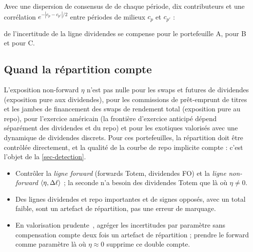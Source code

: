 \begin{example}[Matérialité]\label{ex-materiality}
Avec une dispersion de consensus de  de chaque période, dix contributeurs et une corrélation $e^{-|c_p-c_{p'}|/2}$
entre périodes de milieux $c_p$ et $c_{p'}$ :
\begin{center}\end{center}
\vMatA{} de l'incertitude de la ligne dividendes se compense pour le portefeuille A, \vMatB{} pour B et \vMatC{} pour C.
\end{example}

\subsection{Quand la répartition compte}
L'exposition non-forward $\eta$ n'est pas nulle pour les swaps et futures de dividendes (exposition pure aux
dividendes), pour les commissions de prêt-emprunt de titres et les jambes de financement des swaps de rendement total
(exposition pure au repo), pour l'exercice américain (la frontière d'exercice anticipé dépend séparément des
dividendes et du repo) et pour les exotiques valorisés avec une dynamique de dividendes discrets. Pour ces
portefeuilles, la répartition doit être contrôlée directement, et la qualité de la courbe de repo implicite compte :
c'est l'objet de la \cref{sec-detection}.

\begin{retenir}
\begin{itemize}[leftmargin=12pt]
\item Contrôler la \emph{ligne forward} (forwards Totem, dividendes FO) et la \emph{ligne non-forward}
$\langle \eta, \Delta\ell\rangle$ ; la seconde n'a besoin des dividendes Totem que là où $\eta\ne0$.
\item Des lignes dividendes et repo importantes et de signes opposés, avec un total faible, sont un artefact de
répartition, pas une erreur de marquage.
\item En valorisation prudente~\cite{eu2016}, agréger les incertitudes par paramètre sans compensation compte deux
fois un artefact de répartition ; prendre le forward comme paramètre là où $\eta\approx0$ supprime ce double compte.
\end{itemize}
\end{retenir}
